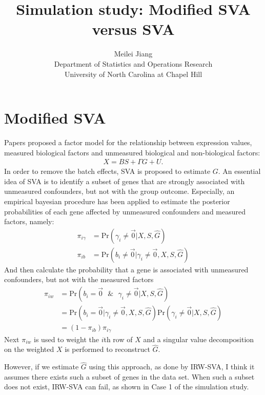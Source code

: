 \documentclass[11pt]{article}
\begin{document}
\author{Meilei Jiang\\
    Department of Statistics and Operations Research\\
		University of North Carolina at Chapel Hill}
\title{Simulation study: Modified SVA versus SVA}

\maketitle
\section{Modified SVA}
Papers \cite{leek2012sva, leek2007capturing, leek2008general} proposed a factor model for the relationship between expression values, measured biological factors and unmeasured biological and non-biological factors:
$$ \begin{aligned}
X = B S + \Gamma G + U.
\end{aligned}$$
In order to remove the batch effects, SVA is proposed to estimate $G$. An essential idea of SVA is to identify a subset of genes that are strongly associated with unmeasured confounders, but not with the group outcome. Especially, an empirical bayesian procedure has been applied to estimate the posterior probabilities of each gene affected by unmeasured confounders and measured factors, namely: 
$$\begin{aligned}
\pi_{i\gamma} &= \text{Pr}( \gamma_i \neq \vec{0}| X, S, \hat{G}) \\
\pi_{i b} &= \text{Pr}(b_i \neq \vec{0} | \gamma_i \neq \vec{0}, X, S, \hat{G}) 
\end{aligned}$$
And then calculate the probability that a gene is associated with unmeasured confounders, but not with the measured factors
$$\begin{aligned}
\pi_{i w} &= \text{Pr}(b_i = \vec{0} \text{ } \& \text{ } \gamma_i \neq \vec{0} | X, S, \hat{G}) \\
&= \text{Pr}(b_i = \vec{0} | \gamma_i \neq \vec{0}, X, S, \hat{G}) \text{Pr}( \gamma_i \neq \vec{0}| X, S, \hat{G}) \\
&= (1 - \pi_{i b})\pi_{i\gamma}                     
\end{aligned}$$
Next $\pi_{i w}$ is used to weight the $i$th row of $X$ and a singular value decomposition on the weighted $X$ is performed to reconstruct $\hat{G}$.

However, if we estimate $\hat{G}$ using this approach, as done by IRW-SVA, I think it assumes there exists such a subset of genes in the data set. When such a subset does not exist, IRW-SVA can fail, as shown in Case 1 of the simulation study.
\end{document}
